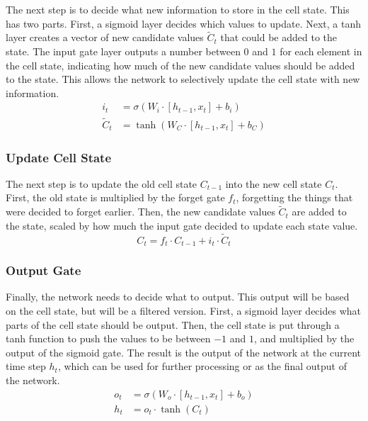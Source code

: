 \documentclass{article}
\begin{document}
The next step is to decide what new information to store in the cell state. This has two
parts. First, a sigmoid layer decides which values to update. Next, a tanh layer creates a
vector of new candidate values $\tilde{C}_t$ that could be added to the state. The input
gate layer outputs a number between $0$ and $1$ for each element in the cell state,
indicating how much of the new candidate values should be added to the state. This allows
the network to selectively update the cell state with new information.
\begin{align}
  i_t         & = \sigma(W_i \cdot [h_{t-1}, x_t] + b_i) \\
  \tilde{C}_t & = \tanh(W_C \cdot [h_{t-1}, x_t] + b_C)
\end{align}


\subsubsection{Update Cell State}
\label{sec:3.0.2}

The next step is to update the old cell state $C_{t-1}$ into the new cell state $C_t$.
First, the old state is multiplied by the forget gate $f_t$, forgetting the things that
were decided to forget earlier. Then, the new candidate values $\tilde{C}_t$ are added to
the state, scaled by how much the input gate decided to update each state value.
\begin{equation}
  C_t = f_t \cdot C_{t-1} + i_t \cdot \tilde{C}_t
\end{equation}


\subsubsection{Output Gate}
\label{sec:3.0.3}

Finally, the network needs to decide what to output. This output will be based on the cell
state, but will be a filtered version. First, a sigmoid layer decides what parts of the
cell state should be output. Then, the cell state is put through a tanh function to push
the values to be between $-1$ and $1$, and multiplied by the output of the sigmoid gate.
The result is the output of the network at the current time step $h_t$, which can be used
for further processing or as the final output of the network.
\begin{align}
  o_t & = \sigma(W_o \cdot [h_{t-1}, x_t] + b_o) \\
  h_t & = o_t \cdot \tanh(C_t)
\end{align}
\end{document}
